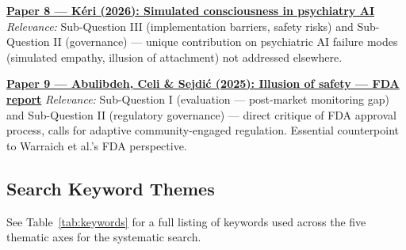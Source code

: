 \medskip
\noindent\textbf{\underline{Paper 8 — Kéri (2026): Simulated consciousness in psychiatry AI}}
\textit{Relevance:} Sub-Question III (implementation barriers, safety risks) and
Sub-Question II (governance) — unique contribution on psychiatric AI failure
modes (simulated empathy, illusion of attachment) not addressed elsewhere.

\medskip
\noindent\textbf{\underline{Paper 9 — Abulibdeh, Celi \& Sejdić (2025): Illusion of safety — FDA report}}
\textit{Relevance:} Sub-Question I (evaluation — post-market monitoring gap)
and Sub-Question II (regulatory governance) — direct critique of FDA approval
process, calls for adaptive community-engaged regulation. Essential counterpoint
to Warraich et al.'s FDA perspective.


\subsection{Search Keyword Themes}
\label{sec:keyword_themes}

See Table~\ref{tab:keywords} for a full listing of keywords used across
the five thematic axes for the systematic search.

